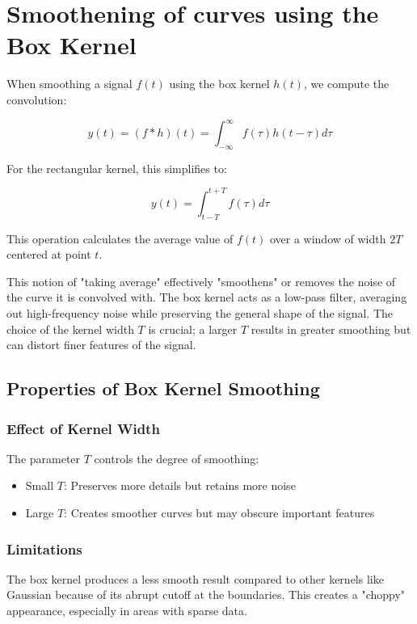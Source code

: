 \section{Smoothening of curves using the Box Kernel}

When smoothing a signal $f(t)$ using the box kernel $h(t)$, we compute the convolution:

$$
y(t) = (f * h)(t) = \int_{-\infty}^{\infty} f(\tau) h(t - \tau) d\tau
$$

For the rectangular kernel, this simplifies to:

$$
y(t) = \int_{t-T}^{t+T} f(\tau) d\tau
$$

This operation calculates the average value of $f(t)$ over a window of width $2T$ centered at point $t$. 
\newline\newline

This notion of "taking average" effectively "smoothens" or removes the noise of the curve it is convolved with. The box kernel acts as a low-pass filter, averaging out high-frequency noise while preserving the general shape of the signal. The choice of the kernel width $T$ is crucial; a larger $T$ results in greater smoothing but can distort finer features of the signal.

\subsection{Properties of Box Kernel Smoothing}

\subsubsection{Effect of Kernel Width}

The parameter $T$ controls the degree of smoothing:
\begin{itemize}
    \item Small $T$: Preserves more details but retains more noise
    \item Large $T$: Creates smoother curves but may obscure important features
\end{itemize}

\subsubsection{Limitations}

The box kernel produces a less smooth result compared to other kernels like Gaussian because of its abrupt cutoff at the boundaries. This creates a "choppy" appearance, especially in areas with sparse data.

